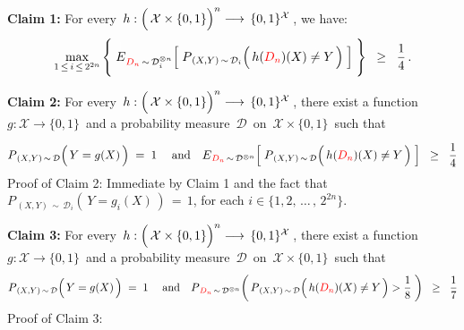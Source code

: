 \vskip 0.5cm
\noindent
\textbf{Claim 1:}\quad
For every
\,$h : \left(\,\mathcal{X}\overset{{\color{white}.}}{\times}\{0,1\}\right)^{n} \longrightarrow \,\{0,1\}^{\mathcal{X}}$\,,
we have:
\begin{equation*}
\underset{1 \,\leq\, i \,\leq\, 2^{2n}}{\max}\left\{\;
	\overset{{\color{white}\vert}}{E}_{{\color{red}D_{n}}\,\sim\,\mathcal{D}_{i}^{\otimes n}}\!\left[\;
		P_{\,(X,Y)\,\sim\,\mathcal{D}_{i}}\!\left(\,h({\color{red}D_{n}})(X) \overset{{\color{white}.}}{\neq} Y\,\right)
		\;\right]
	\;\right\}
	\;\; \geq \;\;
		\dfrac{1}{4}\,.
\end{equation*}

\vskip 1.0cm
\noindent
\textbf{Claim 2:}\quad
For every
\,$h : \left(\,\mathcal{X}\overset{{\color{white}.}}{\times}\{0,1\}\right)^{n} \longrightarrow \,\{0,1\}^{\mathcal{X}}$\,,
there exist a function \,$g : \mathcal{X} \longrightarrow \{0,1\}$\, and
a probability measure \,$\mathcal{D}$\, on \,$\mathcal{X} \times \{0,1\}$\,
such that
\begin{equation*}
P_{\,(X,Y)\,\sim\,\mathcal{D}}\!\left(\,Y \overset{{\color{white}-}}{=} g(X)\,\right) \; = \; 1
\;\quad\textnormal{and}\quad
\overset{{\color{white}\vert}}{E}_{{\color{red}D_{n}}\,\sim\,\mathcal{D}^{\otimes n}}\!\left[\;
	P_{\,(X,Y)\,\sim\,\mathcal{D}}\!\left(\,h({\color{red}D_{n}})(X) \overset{{\color{white}.}}{\neq} Y\,\right)
	\;\right]
\;\; \geq \;\;
	\dfrac{1}{4}
\end{equation*}
Proof of Claim 2:\quad
Immediate by Claim 1 and the fact that \,$P_{\,(X,Y)\,\sim\,\mathcal{D}_{i}}\!\left(\,Y = g_{i}(X)\,\right) \,=\, 1$,
for each $i \in \{1,2,\,\ldots\,,\,2^{2n}\}$.

\vskip 1.0cm
\noindent
\textbf{Claim 3:}\quad
For every
\,$h : \left(\,\mathcal{X}\overset{{\color{white}.}}{\times}\{0,1\}\right)^{n} \longrightarrow \,\{0,1\}^{\mathcal{X}}$\,,
there exist a function \,$g : \mathcal{X} \longrightarrow \{0,1\}$\, and
a probability measure \,$\mathcal{D}$\, on \,$\mathcal{X} \times \{0,1\}$\,
such that
\begin{equation*}
P_{\,(X,Y)\,\sim\,\mathcal{D}}\!\left(\,Y \overset{{\color{white}-}}{=} g(X)\,\right) \; = \; 1
\;\quad\textnormal{and}\quad
\overset{{\color{white}\vert}}{P}_{{\color{red}D_{n}}\,\sim\,\mathcal{D}^{\otimes n}}\!\left(\,
	P_{\,(X,Y)\,\sim\,\mathcal{D}}\!\left(\,h({\color{red}D_{n}})(X) \overset{{\color{white}.}}{\neq} Y\,\right) > \dfrac{1}{8}
	\;\right)
\;\; \geq \;\;
	\dfrac{1}{7}
\end{equation*}
Proof of Claim 3:\quad

